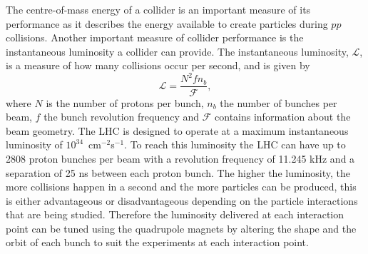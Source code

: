 The centre-of-mass energy of a collider is an important measure of its performance as it describes the energy available to create particles during $pp$ collisions. Another important measure of collider performance is the instantaneous luminosity a collider can provide. The instantaneous luminosity, $\mathcal{L}$, is a measure of how many collisions occur per second, and is given by
\begin{equation}
\mathcal{L} = \frac{N^{2} f n_{b}}{\mathcal{F}},
\label{eq:inst_lumi}
\end{equation}
where $N$ is the number of protons per bunch, $n_{b}$ the number of bunches per beam, $f$ the bunch revolution frequency and $\mathcal{F}$ contains information about the beam geometry. The LHC is designed to operate at a maximum instantaneous luminosity of $10^{34}$~cm$^{-2}$s$^{-1}$. To reach this luminosity the LHC can have up to 2808 proton bunches per beam with a revolution frequency of 11.245 kHz and a separation of 25 ns between each proton bunch. %
The higher the luminosity, the more collisions happen in a second and the more particles can be produced, this is either advantageous or disadvantageous depending on the particle interactions that are being studied.
Therefore the luminosity delivered at each interaction point can be tuned using the quadrupole magnets by altering the shape and the orbit of each bunch to suit the experiments at each interaction point.



